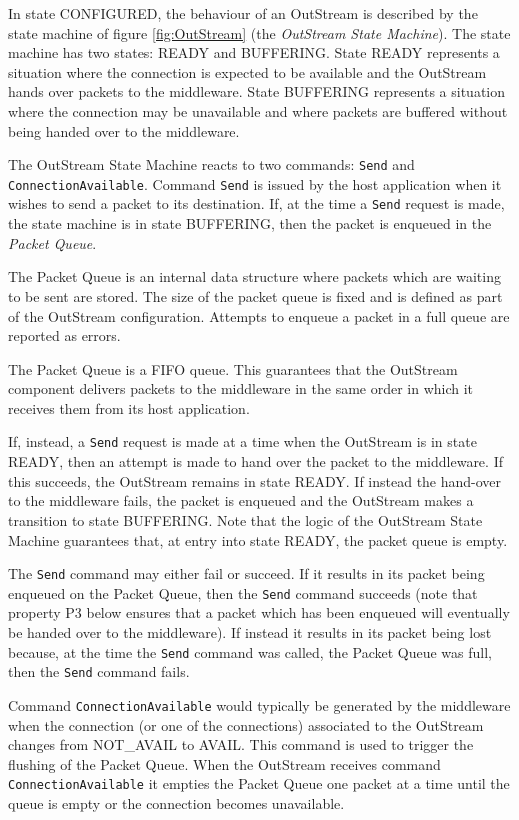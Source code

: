In state CONFIGURED, the behaviour of an OutStream is described by the state machine of figure \ref{fig:OutStream} (the \textit{OutStream State Machine}). The state machine has two states: READY and BUFFERING. State READY represents a situation where the connection is expected to be available and the OutStream hands over packets to the middleware. State BUFFERING represents a situation where the connection may be unavailable and where packets are buffered without being handed over to the middleware.

The OutStream State Machine reacts to two commands: \texttt{Send} and \texttt{ConnectionAvailable}. Command \texttt{Send} is issued by the host application when it wishes to send a packet to its destination. If, at the time a \texttt{Send} request is made, the state machine is in state BUFFERING, then the packet is enqueued in the \textit{Packet Queue}. 

The Packet Queue is an internal data structure where packets which are waiting to be sent are stored. The size of the packet queue is fixed and is defined as part of the OutStream configuration. Attempts to enqueue a packet in a full queue are reported as errors.

The Packet Queue is a FIFO queue. This guarantees that the OutStream component delivers packets to the middleware in the same order in which it receives them from its host application. 

If, instead, a \texttt{Send} request is made at a time when the OutStream is in state READY, then an attempt is made to hand over the packet to the middleware. If this succeeds, the OutStream remains in state READY. If instead the hand-over to the middleware fails, the packet is enqueued and the OutStream makes a transition to state BUFFERING. Note that the logic of the OutStream State Machine guarantees that, at entry into state READY, the packet queue is empty.
 
The \texttt{Send} command may either fail or succeed. If it results in its packet being enqueued on the Packet Queue, then the \texttt{Send} command succeeds (note that property P3 below ensures that a packet which has been enqueued will eventually be handed over to the middleware). If instead it results in its packet being lost because, at the time the \texttt{Send} command was called, the Packet Queue was full, then the \texttt{Send} command fails. 

Command \texttt{ConnectionAvailable} would typically be generated by the middleware when the connection (or one of the connections) associated to the OutStream changes from NOT\_AVAIL to AVAIL. This command is used to trigger the flushing of the Packet Queue. When the OutStream receives command \texttt{ConnectionAvailable} it empties the Packet Queue one packet at a time until the queue is empty or the connection becomes unavailable.

